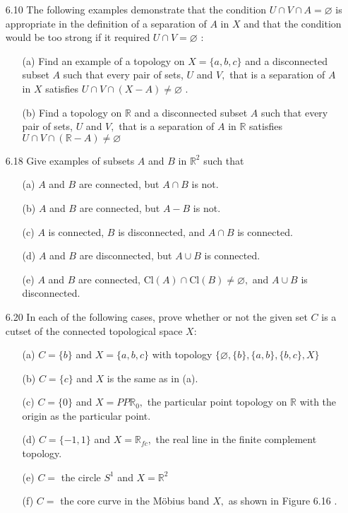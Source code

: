 \documentclass[12pt]{article}
\begin{document}
\begin{enumerate}
		\item[6.10] The following examples demonstrate that the condition $U \cap V \cap A = \varnothing$ is appropriate in the definition of a separation of $A$ in $X$ and that the condition would be too strong if it required $U \cap V = \varnothing$ :
		\begin{enumerate}
			\item[(a)] Find an example of a topology on $X = \{ a , b , c \}$ and a disconnected subset
			$A$ such that every pair of sets, $U$ and $V ,$ that is a separation of $A$ in $X$
			satisfies $U \cap V \cap ( X - A ) \neq \varnothing$ .
			\item[(b)] Find a topology on $\mathbb { R }$ and a disconnected subset $A$ such that every pair of
			sets, $U$ and $V ,$ that is a separation of $A$ in $\mathbb { R }$ satisfies $U \cap V \cap ( \mathbb { R } - A ) \neq \varnothing$
		\end{enumerate}
		\item[6.18] Give examples of subsets $A$ and $B$ in $\mathbb { R } ^ { 2 }$ such that
		\begin{enumerate}
			\item[(a)] $A$ and $B$ are connected, but $A \cap B$ is not.
			\item[(b)] $A$ and $B$ are connected, but $A - B$ is not.
			\item[(c)] $A$ is connected, $B$ is disconnected, and $A \cap B$ is connected.
			\item[(d)] $A$ and $B$ are disconnected, but $A \cup B$ is connected.
			\item[(e)] $A$ and $B$ are connected, $\mathrm { Cl } ( A ) \cap \mathrm { Cl } ( B ) \neq \varnothing ,$ and $A \cup B$ is disconnected.
		\end{enumerate}
		
		\item[6.20] In each of the following cases, prove whether or not the given set $C$ is a cutset of the connected topological space $X :$
		\begin{enumerate}
			\item[(a)] $C = \{ b \}$ and $X = \{ a , b , c \}$ with topology $\{ \varnothing , \{ b \} , \{ a , b \} , \{ b , c \} , X \}$
			\item[(b)] $C = \{ c \}$ and $X$ is the same as in (a).
			\item[(c)] $C = \{ 0 \}$ and $X = P P \mathbb { R } _ { 0 } ,$ the particular point topology on $\mathbb { R }$ with the
			origin as the particular point.
			\item[(d)]	$C = \{ - 1,1 \}$ and $X = \mathbb { R } _ { f c } ,$ the real line in the finite complement topology.
			\item[(e)] $C =$ the circle $S ^ { 1 }$ and $X = \mathbb { R } ^ { 2 }$
			\item[(f)] $C =$ the core curve in the Möbius band $X ,$ as shown in Figure 6.16 .
		\end{enumerate}
		

\end{enumerate}
\end{document}
